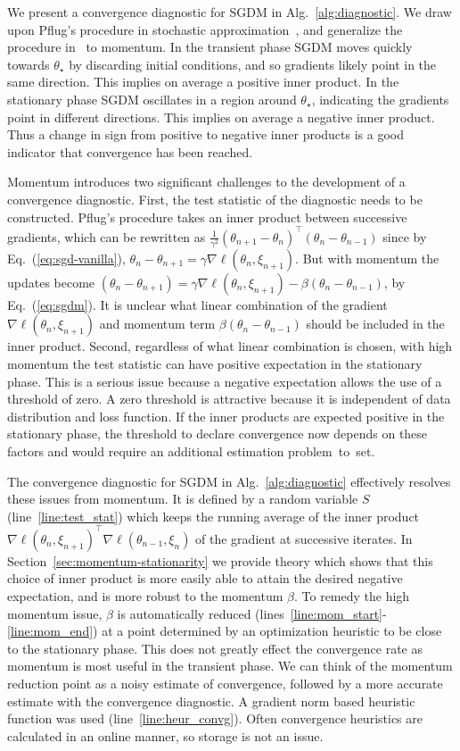 \documentclass[conference]{IEEEtran}
\begin{document}
We present a convergence diagnostic for SGDM in Alg.~\ref{alg:diagnostic}.
We draw upon Pflug's procedure in stochastic approximation~\cite{Article:Pflug_1990}, and generalize the procedure in~\cite{Proc:Chee_AISTATS18} to momentum. In the transient phase SGDM
moves quickly towards $\theta_\star$ by discarding initial conditions, and so gradients likely point in the same direction.
This implies on average a positive inner product.
In the stationary phase SGDM oscillates in a region around $\theta_\star$, indicating the gradients point in different directions.
This implies on average a negative inner product.
Thus a change in sign from positive to negative inner products is a good indicator that convergence has been reached.

Momentum introduces two significant challenges to the development of a convergence diagnostic.
First, the test statistic of the diagnostic needs to be constructed.
Pflug's procedure takes an inner product between successive gradients, which can be rewritten as $\frac{1}{\gamma^2} (\theta_{n+1} - \theta_n)^\top(\theta_n - \theta_{n-1})$ since by Eq.~(\ref{eq:sgd-vanilla}), $\theta_{n} - \theta_{n+1} = \gamma \nabla \ell (\theta_{n}, \xi_{n+1})$.
But with momentum the updates become $(\theta_n - \theta_{n+1}) = \gamma \nabla \ell(\theta_{n}, \xi_{n+1}) - \beta(\theta_n - \theta_{n-1})$, by Eq.~(\ref{eq:sgdm}).
It is unclear what linear combination of the gradient $\nabla \ell(\theta_n, \xi_{n+1})$ and momentum term $\beta(\theta_n - \theta_{n-1})$ should be included in the inner product. Second, regardless of what linear combination is chosen, with high momentum the test statistic can have positive expectation in the stationary phase.
This is a serious issue because a negative expectation allows the use of a threshold of zero.
A zero threshold is attractive because it is  independent of data distribution and loss function. If the inner products are expected positive in the stationary phase, the threshold to declare convergence now depends on these factors and would require an additional estimation problem~to~set.

The convergence diagnostic for SGDM in Alg.~\ref{alg:diagnostic} effectively resolves these issues from momentum. It is defined by a random variable $S$ (line~\ref{line:test_stat}) which keeps the running average of the inner product $\nabla \ell (\theta_n, \xi_{n+1})^\top \nabla \ell (\theta_{n-1}, \xi_n)$ of the gradient at successive iterates.  In Section~\ref{sec:momentum-stationarity} we provide theory which shows that this choice of inner product is more easily able to attain the desired negative expectation, and is more robust to the momentum $\beta$. To remedy the high momentum issue, $\beta$ is automatically reduced (lines~\ref{line:mom_start}-\ref{line:mom_end}) at a point determined by an optimization heuristic to be close to the stationary phase. This does not greatly effect the convergence rate as momentum is most useful in the transient phase. We can think of the momentum reduction point as a noisy estimate of convergence, followed by a more accurate estimate with the convergence diagnostic. 
A gradient norm based heuristic function was used (line~\ref{line:heur_convg}).
Often convergence heuristics are calculated in an online manner, so storage is not an issue.
\end{document}

